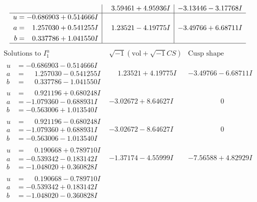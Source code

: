 \documentclass[1p]{elsarticle_modified}
\theoremstyle{definition}
\newcommand{\I}{\sqrt{-1}}
\begin{document}
$$\begin{array}{c|c|c}
 & \phantom{-}3.59461 + 4.95936 I & -3.13446 - 3.17768 I \\ \hline\begin{aligned}
u &= -0.686903 + 0.514666 I \\
a &= \phantom{-}1.257030 + 0.541255 I \\
b &= \phantom{-}0.337786 + 1.041550 I\end{aligned}
 & \phantom{-}1.23521 - 4.19775 I & -3.49766 + 6.68711 I\\
 \hline 
 \end{array}$$\newpage$$\begin{array}{c|c|c}  
\text{Solutions to }I^u_{1}& \I (\text{vol} + \sqrt{-1}CS) & \text{Cusp shape}\\
 \hline 
\begin{aligned}
u &= -0.686903 - 0.514666 I \\
a &= \phantom{-}1.257030 - 0.541255 I \\
b &= \phantom{-}0.337786 - 1.041550 I\end{aligned}
 & \phantom{-}1.23521 + 4.19775 I & -3.49766 - 6.68711 I \\ \hline\begin{aligned}
u &= \phantom{-}0.921196 + 0.680248 I \\
a &= -1.079360 - 0.688931 I \\
b &= -0.563006 + 1.013540 I\end{aligned}
 & -3.02672 + 8.64627 I & \phantom{-0.000000 } 0 \\ \hline\begin{aligned}
u &= \phantom{-}0.921196 - 0.680248 I \\
a &= -1.079360 + 0.688931 I \\
b &= -0.563006 - 1.013540 I\end{aligned}
 & -3.02672 - 8.64627 I & \phantom{-0.000000 } 0 \\ \hline\begin{aligned}
u &= \phantom{-}0.190668 + 0.789710 I \\
a &= -0.539342 - 0.183142 I \\
b &= -1.048020 + 0.360828 I\end{aligned}
 & -1.37174 - 4.55999 I & -7.56588 + 4.82929 I \\ \hline\begin{aligned}
u &= \phantom{-}0.190668 - 0.789710 I \\
a &= -0.539342 + 0.183142 I \\
b &= -1.048020 - 0.360828 I\end{aligned}

\end{array}$$
\end{document}
